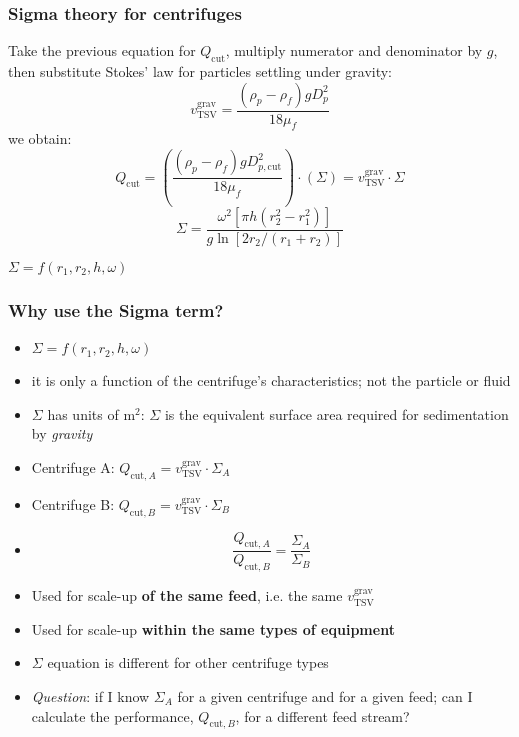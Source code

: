 \begin{frame}\frametitle{Sigma theory for centrifuges}
	Take the previous equation for $Q_\text{cut}$, multiply numerator and denominator by $g$, then substitute Stokes' law for particles settling under gravity:
	\[
		v_\text{TSV}^\text{grav} = \frac{\left( \rho_p - \rho_f \right) g D_p^2}{18 \mu_f}
	\]
	we obtain:
	\[
		Q_\text{cut} =  \left( \frac{\left( \rho_p - \rho_f \right) g D_{p,\text{cut}}^2}{18 \mu_f}  \right) \cdot ( \Sigma ) =  v_\text{TSV}^\text{grav} \cdot \Sigma
	\]
	\[
		\Sigma = \frac{\omega^2 \left[\pi h \left(r_2^2 - r_1^2\right)\right]}{g \ln \left[2r_2/(r_1+r_2) \right]}
	\]

	\vspace{12pt}
	$\Sigma = f(r_1, r_2, h, \omega)$
\end{frame}

\begin{frame}\frametitle{Why use the Sigma term?}
	\begin{itemize}
		\item	$\Sigma = f(r_1, r_2, h, \omega)$
		\item	it is only a function of the centrifuge's characteristics; not the particle or fluid
		\item	$\Sigma$ has units of $\text{m}^2$: {\color{purple}$\Sigma$ is the equivalent surface area} required for sedimentation by \emph{gravity}
		\item	Centrifuge A: $Q_{\text{cut},A} = v_\text{TSV}^\text{grav} \cdot \Sigma_A$
		\item	Centrifuge B: $Q_{\text{cut},B} = v_\text{TSV}^\text{grav} \cdot \Sigma_B$
		\item	\[
					\frac{Q_{\text{cut},A}}{Q_{\text{cut},B}}  = \frac{\Sigma_A}{\Sigma_B}
				\]
		\item	Used for scale-up \textbf{of the same feed}, i.e. the same $v_\text{TSV}^\text{grav}$
		\item	Used for scale-up \textbf{within the same types of equipment}
		\item	$\Sigma$ equation is different for other centrifuge types
		\item	\emph{Question}: if I know $\Sigma_A$ for a given centrifuge and for a given feed; can I calculate the performance, $Q_{\text{cut},B}$, for a different feed stream?
	\end{itemize}
\end{frame}

